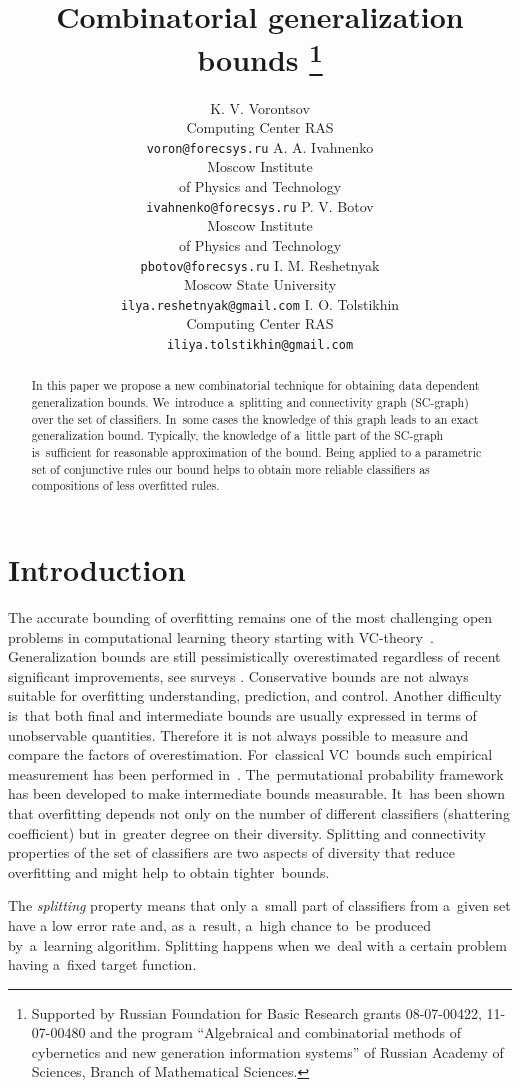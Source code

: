 \documentclass{article}
\title{%
    Combinatorial generalization bounds%
    \thanks{Supported by Russian Foundation for Basic Research
        grants 08-07-00422, 11-07-00480 and the program
        ``Algebraical and combinatorial methods of cybernetics and new generation information systems''
        of Russian Academy of Sciences, Branch of Mathematical Sciences.}
}
\author{
    K. V. Vorontsov\\
    Computing Center RAS\\
    \texttt{\small voron@forecsys.ru}
\And
    A. A. Ivahnenko\\
    Moscow Institute \\of Physics and Technology\\
    \texttt{\small ivahnenko@forecsys.ru}
\And
    P. V. Botov\\
    Moscow Institute \\of Physics and Technology\\
    \texttt{\small pbotov@forecsys.ru}
\AND
    I. M. Reshetnyak\\
    Moscow State University\\
    \texttt{\small ilya.reshetnyak@gmail.com}
\And
    I. O. Tolstikhin\\
    Computing Center RAS\\
    \texttt{\small iliya.tolstikhin@gmail.com}
}
\let\cite\citep
\renewcommand{\emph}[1]{\textit{#1}}
\begin{document}
\maketitle

\begin{abstract}
    In this paper we propose a new combinatorial technique
    for obtaining data dependent generalization bounds.
    We~introduce a~splitting and connectivity graph (SC-graph) over the set of classifiers.
    In~some cases the knowledge of this graph leads to an exact generalization bound.
    Typically, the knowledge of a~little part of the SC-graph is~sufficient
    for reasonable approximation of the bound.
    Being applied to a parametric set of conjunctive rules our bound
    helps to obtain more reliable classifiers as compositions of less overfitted rules.
\end{abstract}

\section{Introduction}

The accurate bounding of overfitting %
remains one of the most challenging open problems in computational learning theory
starting with VC-theory~\cite{vapnik71uniform-eng}.
Generalization bounds are still pessimistically overestimated
regardless of recent significant improvements, see surveys
\cite{vayatis99distributiondependent,langford02quantitatively,boucheron05theory}.
Conservative bounds are not always suitable for overfitting understanding, prediction, and control.
Another difficulty is~that both final and intermediate bounds
are usually expressed in terms of unobservable quantities.
Therefore it is not always possible to measure and compare the factors of overestimation.
For~classical VC~bounds
such empirical measurement has been performed in~\cite{voron08pria-eng}.
The~permutational probability framework has been developed
to make intermediate bounds measurable.
It~has been shown that overfitting depends
not only on the number of different classifiers (shattering coefficient)
but in~greater degree on their diversity.
Splitting and connectivity properties of the set of classifiers are two aspects of diversity
that reduce overfitting and might help to obtain tighter~bounds.

The \emph{splitting} property means that
only a~small part of classifiers from a~given set have a low error rate
and, as a~result, a~high chance to~be produced by~a~learning algorithm.
Splitting happens when we~deal with a certain problem having a~fixed target function.
\end{document}
